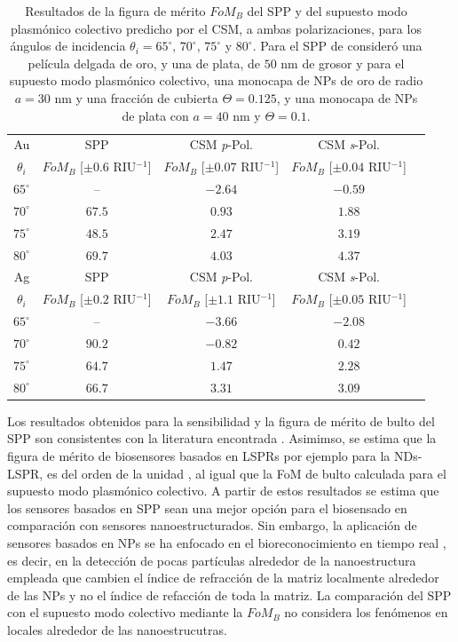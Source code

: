 \begin{table}[h!]
\centering
\caption{Resultados de la figura de mérito $\textit{FoM}_B$ del SPP y del supuesto modo  plasmónico colectivo predicho por el CSM, a ambas polarizaciones, para los ángulos de incidencia $\theta_i = 65^\circ,\,70^\circ,\, 75^\circ$ y $80^\circ$. Para el SPP de consideró una película delgada de oro, y una de plata, de $50$ nm de grosor y para el supuesto modo  plasmónico colectivo, una monocapa de NPs de oro de radio $a=30$ nm y una fracción de cubierta $\Theta=0.125$, y una monocapa de NPs de plata con $a=40$ nm y $\Theta=0.1$.}\vspace*{-.7em}
\label{tab:FoM}\small
\begin{tabular}{c||c||ccc}
Au & SPP  & CSM \emph{p}-Pol. 	& CSM \emph{s}-Pol. \\ 
$\theta_i$ &  $\textit{FoM}_B$ [$\pm 0.6$ RIU$^{-1}$]	  &  $\textit{FoM}_B$ [$\pm 0.07$ RIU$^{-1}$]		&  $\textit{FoM}_B$  [$\pm 0.04$ RIU$^{-1}$]\\ \hline
$65^\circ$ & --			  &	$-2.64$ & $-0.59$\\
$70^\circ$ & $67.5$ &	$0.93$ & $1.88$\\
$75^\circ$ & $48.5$ &	$2.47$ & $3.19$\\
$80^\circ$ & $69.7$ &	$4.03$ & $4.37$\\
\hline \hline
Ag & SPP  & CSM \emph{p}-Pol. 	& CSM \emph{s}-Pol. \\ 
$\theta_i$ &  $\textit{FoM}_B$ [$\pm 0.2$ RIU$^{-1}$]	  &  $\textit{FoM}_B$ [$\pm 1.1$ RIU$^{-1}$]		&  $\textit{FoM}_B$  [$\pm 0.05$ RIU$^{-1}$]\\ \hline
$65^\circ$ & -- 			  &	$-3.66$ & $-2.08$\\
$70^\circ$ & $90.2$ &	$-0.82$ & $0.42$\\
$75^\circ$ & $64.7$ &	$1.47$  & $2.28$\\
$80^\circ$ & $66.7$ &	$3.31$  & $3.09$
\end{tabular}
\end{table}


Los resultados obtenidos para la sensibilidad y la figura de mérito de bulto del SPP son consistentes con la literatura encontrada \cite{estevez2014trends,danilov2018ultra,svedendahl2009refractometric}. Asimimso, se estima que la figura de mérito de biosensores basados en LSPRs por ejemplo para la NDs-LSPR, es del orden de la unidad \cite{svedendahl2009refractometric}, al igual que la FoM de bulto calculada para el supuesto modo  plasmónico colectivo. A partir de estos resultados se estima que los sensores basados en SPP sean una mejor opción para el biosensado en comparación con sensores nanoestructurados. Sin embargo, la aplicación de sensores basados en NPs  se ha enfocado en el bioreconocimiento en tiempo real \cite{estevez2014trends,svedendahl2009refractometric}, es decir, en la detección de pocas partículas alrededor de la nanoestructura empleada que cambien el índice de refracción de la matriz localmente alrededor de las NPs y no el índice de refacción de toda la matriz. La comparación del SPP  con el supuesto modo colectivo mediante la $\textit{FoM}_B$ no considera los fenómenos en locales alrededor de las nanoestrucutras.